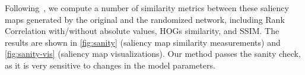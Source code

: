 Following~\citep{adebayosanity}, we compute a number of similarity metrics between these saliency maps generated by the original and the randomized network, including Rank Correlation with/without absolute values, HOGs similarity, and SSIM. The results are shown in \autoref{fig:sanity} (saliency map similarity measurements) and \autoref{fig:sanity-vis} (saliency map visualizations). Our method passes the sanity check, as it is very sensitive to changes in the model parameters. 


